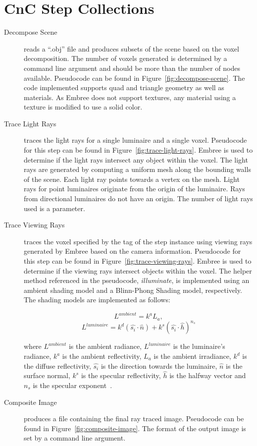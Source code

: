 \section{CnC Step Collections}
\label{sec:implementation-step-collections}
\begin{description}
\item[Decompose Scene]reads a ``.obj'' file and produces 
subsets of the scene based on the voxel decomposition.  The number of voxels 
generated is determined by a command line argument and should be more than the 
number of nodes available.  Pseudocode can be found in 
Figure~\ref{fig:decompose-scene}.  The code implemented supports quad and 
triangle geometry as well as materials.  As Embree does not support 
textures, any material using a texture is modified to use a solid color.  
\item[Trace Light Rays] traces the light rays for a single luminaire 
and a single voxel.  Pseudocode for this step can be found in 
Figure~\ref{fig:trace-light-rays}.  Embree is used to determine if the light 
rays intersect any object within the voxel. The light rays are generated by
computing a uniform mesh along the bounding walls of the scene.  Each light ray
points towards a vertex on the mesh.  Light rays for point luminaires
originate from the origin of the luminaire.  Rays from directional luminaires do
not have an origin.  The number of light rays used is a parameter.
\item[Trace Viewing Rays] traces the voxel specified by the 
tag of the step instance using viewing rays generated by Embree based on the
camera information.  Pseudocode for this step can be found in
Figure~\ref{fig:trace-viewing-rays}.  Embree is used to determine if the
viewing rays intersect objects within the voxel.  The helper method referenced
in the pseudocode, \emph{illuminate}, is implemented using an ambient shading
model and a Blinn-Phong Shading model, respectively.  
\newpage
The shading models are implemented as follows:

$$ L^{ambient} = k^a L_a, $$
$$ L^{luminaire} = k^d ( \hat{s_i} \cdot \hat{n}) +
k^s ( \hat{s_i} \cdot \hat{h} )^{n_s} $$

\noindent where $L^{ambient}$ is the ambient radiance, $L^{luminaire}$ is the
luminaire's radiance, $k^a$ is the ambient reflectivity, $L_a$ is the ambient
irradiance, $k^d$ is the diffuse reflectivity, $\hat{s_i}$ is the direction
towards the luminaire, $\hat{n}$ is the surface normal, $k^s$ is the specular
reflectivity, $\hat{h}$ is the halfway vector and $n_s$ is the specular
exponent~\cite{cpts548}.

\item[Composite Image] produces a file containing the final ray traced image. 
Pseudocode can be found in Figure~\ref{fig:composite-image}.  The format of the
output image is set by a command line argument.

\end{description}











